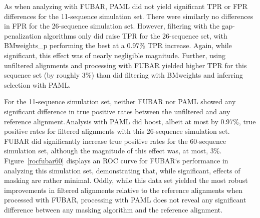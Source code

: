 \documentclass[10pt]{article}
\begin{document}
As when analyzing with FUBAR, PAML did not yield significant TPR or FPR differences for the 11-sequence simulation set. There were similarly no differences in FPR for the 26-sequence simulation set. However, filtering with the gap-penalization algorithms only did raise TPR for the 26-sequence set, with BMweights_p performing the best at a 0.97\% TPR increase. Again, while significant, this effect was of nearly negligible magnitude. Further, using unfiltered alignments and processing with FUBAR yielded higher TPR for this sequence set (by roughly 3\%) than did filtering with BMweights and inferring selection with PAML. 



For the 11-sequence simulation set, neither FUBAR nor PAML showed any significant difference in true positive rates between the unfiltered and any reference alignment.Analysis with PAML did boost, albeit at most by 0.97\%, true positive rates for filtered alignments with this 26-sequence simulation set. 
FUBAR did significantly increase true positive rates for the 60-sequence simulation set, although the magnitude of this effect was, at most, 3\%. Figure~\ref{rocfubar60} displays an ROC curve for FUBAR`s performance in analyzing this simulation set, demonstrating that, while significant, effects of masking are rather minimal. Oddly, while this data set yielded the most robust improvements in filtered alignments relative to the reference alignments when processed with FUBAR, processing with PAML does not reveal any significant difference between any masking algorithm and the reference alignment.
\end{document}
